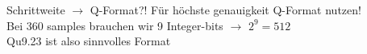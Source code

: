 \documentclass[aspectratio=169,presentation]{beamer}
\begin{document}
\begin{frame} {Schrittweite $\rightarrow$ Q-Format?!}
  Für höchste genauigkeit Q-Format nutzen!\\
  \vspace{0.5cm}
  \pause
  Bei 360 samples brauchen wir 9 Integer-bits $\rightarrow$ $2^9 = 512$ \\
  \vspace{0.5cm}
  Qu9.23 ist also sinnvolles Format
\end{frame}
\end{document}
